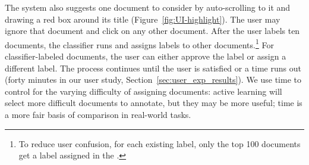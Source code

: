 The system also suggests one document to
consider by auto-scrolling to it and drawing a red box around its title
(Figure~\ref{fig:UI-highlight}). The user may ignore that document and click on any other
document. After the user labels ten documents, the classifier runs and assigns
labels to other documents.\footnote{To reduce user confusion, for each existing
  label, only the top 100 documents get a label assigned in the .} For
classifier-labeled documents, the user can either approve the label or assign a
different label. The process continues until the user is satisfied or a time
runs out (forty minutes in our user study, Section~\ref{sec:user_exp_results}).
We use time to control for the varying difficulty of assigning documents: active
learning will select more difficult documents to annotate, but they may be more
useful; time is a more fair basis of comparison in real-world tasks.